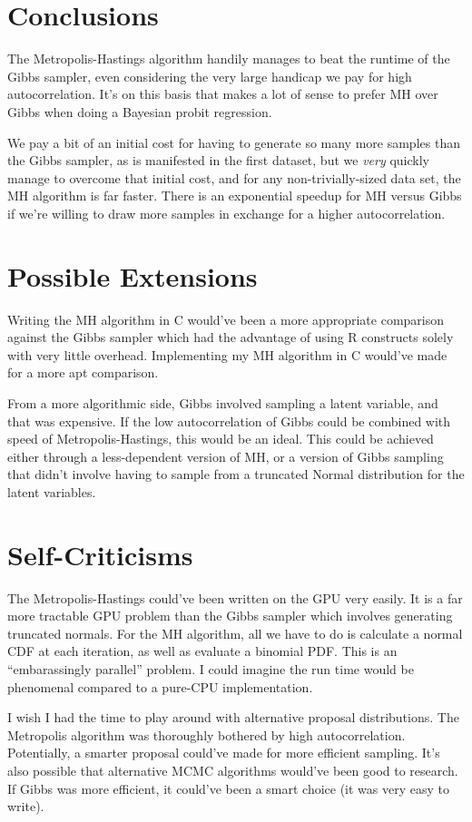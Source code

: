 \documentclass[12pt]{article}
\begin{document}
\section{Conclusions}
The Metropolis-Hastings algorithm handily manages to beat the runtime of the Gibbs sampler, even considering the very large handicap we pay for high autocorrelation. It's on this basis that makes a lot of sense to prefer MH over Gibbs when doing a Bayesian probit regression.

We pay a bit of an initial cost for having to generate so many more samples than the Gibbs sampler, as is manifested in the first dataset, but we \emph{very} quickly manage to overcome that initial cost, and for any non-trivially-sized data set, the MH algorithm is far faster. There is an exponential speedup for MH versus Gibbs if we're willing to draw more samples in exchange for a higher autocorrelation.

\section{Possible Extensions}
Writing the MH algorithm in C would've been a more appropriate comparison against the Gibbs sampler which had the advantage of using R constructs solely with very little overhead. Implementing my MH algorithm in C would've made for a more apt comparison.

From a more algorithmic side, Gibbs involved sampling a latent variable, and that was expensive. If the low autocorrelation of Gibbs could be combined with speed of Metropolis-Hastings, this would be an ideal. This could be achieved either through a less-dependent version of MH, or a version of Gibbs sampling that didn't involve having to sample from a truncated Normal distribution for the latent variables.

\section{Self-Criticisms}
The Metropolis-Hastings could've been written on the GPU very easily. It is a far more tractable GPU problem than the Gibbs sampler which involves generating truncated normals. For the MH algorithm, all we have to do is calculate a normal CDF at each iteration, as well as evaluate a binomial PDF. This is an ``embarassingly parallel'' problem. I could imagine the run time would be phenomenal compared to a pure-CPU implementation.

I wish I had the time to play around with alternative proposal distributions. The Metropolis algorithm was thoroughly bothered by high autocorrelation. Potentially, a smarter proposal could've made for more efficient sampling. It's also possible that alternative MCMC algorithms would've been good to research. If Gibbs was more efficient, it could've been a smart choice (it was very easy to write).
\end{document}
